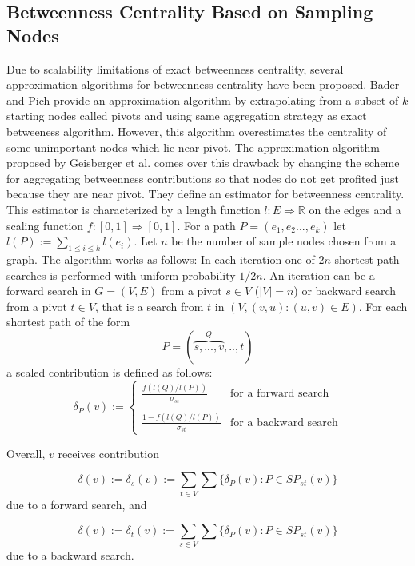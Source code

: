 \documentclass[runningheads,a4paper]{llncs}
\begin{document}
\subsection*{Betweenness Centrality Based on Sampling Nodes}
Due to scalability limitations of exact betweenness centrality, several approximation algorithms for betweenness centrality have been proposed. Bader and Pich\cite{bp} provide an approximation algorithm by extrapolating from a subset of $k$ starting nodes called pivots and using same aggregation strategy as exact betweeness algorithm. However, this algorithm overestimates the centrality of some unimportant nodes which lie near pivot. The approximation algorithm proposed by Geisberger et al. \cite{sanders} comes over this drawback by changing the scheme for aggregating betweenness contributions so that nodes do not get profited just because they are near pivot. They define an estimator for betweenness centrality. This estimator is characterized by a length function $l : E \Rightarrow \mathbb{R}$ on the edges and a scaling function $f : [0,1] \Rightarrow [0,1]$. For a path $P = (e_{1},e_{2}...,e_{k})$ let $l(P) := \sum_{1 \leq i \leq k} l(e_{i})$. Let $n$ be the number of sample nodes chosen from a graph. The algorithm works as follows: In each iteration one of $2n$ shortest path searches is performed with uniform probability $1/2n$. An iteration can be a forward search in $G = (V,E)$ from a pivot $s \in V$ ($|V| = n$) or backward search from a pivot $t \in V$, that is a search from $t$ in $(V,{(v,u) : (u,v) \in E})$. For each shortest path of the form 
$$ P = (\overbrace{s,...,v}^{Q},..,t)$$ 
a scaled contribution is defined as follows:\\

\begin{equation*}
	\delta_{P}(v) := \begin{cases}
					\frac{f(l(Q)/l(P))}{\sigma_{st}} & \text{for a forward search} \\\\
					\frac{1 - f(l(Q)/l(P))}{\sigma_{st}} & \text{for a backward search} 
					\end{cases}
\end{equation*}

Overall, $v$ receives contribution 

$$\delta(v) := \delta_{s}(v) := \sum_{t \in V}\sum \{\delta_{P}(v):  P \in SP_{st}(v)\}$$
due to a forward search, and 

$$\delta(v) := \delta_{t}(v) := \sum_{s \in V}\sum \{\delta_{P}(v):  P \in SP_{st}(v)\}$$
due to a backward search. 
\end{document}
